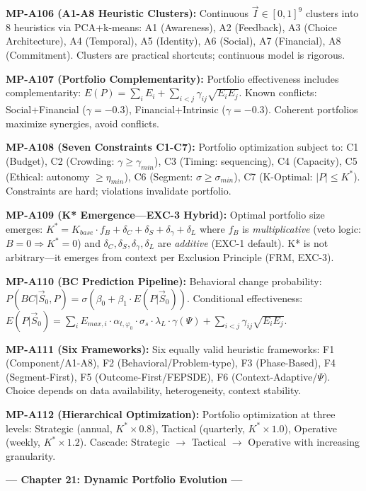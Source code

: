 \begin{tcolorbox}[colback=gray!5!white, colframe=gray!75!black,
    title=\textbf{MP Axioms}]
\textbf{MP-A106 (A1-A8 Heuristic Clusters):} Continuous $\vec{I} \in [0,1]^9$ clusters into 8 heuristics via PCA+k-means: A1 (Awareness), A2 (Feedback), A3 (Choice Architecture), A4 (Temporal), A5 (Identity), A6 (Social), A7 (Financial), A8 (Commitment). Clusters are practical shortcuts; continuous model is rigorous.

\textbf{MP-A107 (Portfolio Complementarity):} Portfolio effectiveness includes complementarity: $E(P) = \sum_i E_i + \sum_{i<j} \gamma_{ij} \sqrt{E_i E_j}$. Known conflicts: Social+Financial ($\gamma = -0.3$), Financial+Intrinsic ($\gamma = -0.3$). Coherent portfolios maximize synergies, avoid conflicts.

\textbf{MP-A108 (Seven Constraints C1-C7):} Portfolio optimization subject to: C1 (Budget), C2 (Crowding: $\gamma \geq \gamma_{min}$), C3 (Timing: sequencing), C4 (Capacity), C5 (Ethical: autonomy $\geq \eta_{min}$), C6 (Segment: $\sigma \geq \sigma_{min}$), C7 (K-Optimal: $|P| \leq K^*$). Constraints are hard; violations invalidate portfolio.

\textbf{MP-A109 (K* Emergence---EXC-3 Hybrid):} Optimal portfolio size emerges: $K^* = K_{base} \cdot f_B + \delta_C + \delta_S + \delta_\gamma + \delta_L$ where $f_B$ is \textit{multiplicative} (veto logic: $B=0 \Rightarrow K^*=0$) and $\delta_C, \delta_S, \delta_\gamma, \delta_L$ are \textit{additive} (EXC-1 default). K* is not arbitrary---it emerges from context per Exclusion Principle (FRM, EXC-3).

\textbf{MP-A110 (BC Prediction Pipeline):} Behavioral change probability: $P(BC | \vec{S}_0, P) = \sigma(\beta_0 + \beta_1 \cdot E(P | \vec{S}_0))$. Conditional effectiveness: $E(P|\vec{S}_0) = \sum_i E_{max,i} \cdot \alpha_{t,\varphi_0} \cdot \sigma_s \cdot \lambda_L \cdot \gamma(\Psi) + \sum_{i<j} \gamma_{ij}\sqrt{E_i E_j}$.

\textbf{MP-A111 (Six Frameworks):} Six equally valid heuristic frameworks: F1 (Component/A1-A8), F2 (Behavioral/Problem-type), F3 (Phase-Based), F4 (Segment-First), F5 (Outcome-First/FEPSDE), F6 (Context-Adaptive/$\Psi$). Choice depends on data availability, heterogeneity, context stability.

\textbf{MP-A112 (Hierarchical Optimization):} Portfolio optimization at three levels: Strategic (annual, $K^* \times 0.8$), Tactical (quarterly, $K^* \times 1.0$), Operative (weekly, $K^* \times 1.2$). Cascade: Strategic $\to$ Tactical $\to$ Operative with increasing granularity.

\textbf{--- Chapter 21: Dynamic Portfolio Evolution ---}


\end{tcolorbox}
